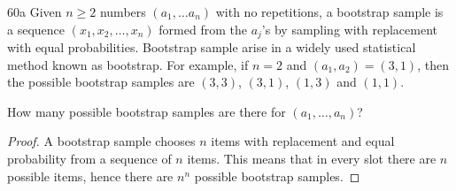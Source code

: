 \begin{exercise}{60a}
    Given $n \geq 2$ numbers $(a_1, \dots a_n)$ with no repetitions, a bootstrap sample is a sequence $(x_1, x_2, \dots, x_n)$ formed from the $a_j$'s by sampling with replacement with equal probabilities. Bootstrap sample arise in a widely used statistical method known as bootstrap. For example, if $n=2$ and $(a_1, a_2) = (3,1)$, then the possible bootstrap samples are $(3,3)$, $(3,1)$, $(1,3)$ and $(1,1)$.

    How many possible bootstrap samples are there for $(a_1, \dots, a_n)$?
\end{exercise}

\begin{proof}
    A bootstrap sample chooses $n$ items with replacement and equal probability from a sequence of $n$ items. This means that in every slot there are $n$ possible items, hence there are $n^n$ possible bootstrap samples.
\end{proof}


